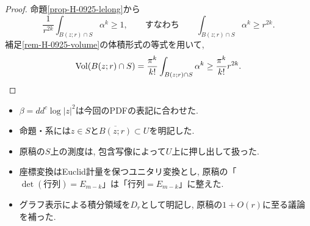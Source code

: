 \begin{proof}
命題\ref{prop-H-0925-lelong}から
\begin{equation*}
\frac{1}{r^{2k}}\int_{B(z;r)\cap S}\alpha^k\geq1,
\qquad\text{すなわち}\qquad
\int_{B(z;r)\cap S}\alpha^k\geq r^{2k}.
\end{equation*}
補足\ref{rem-H-0925-volume}の体積形式の等式を用いて,
\begin{equation*}
\operatorname{Vol}(B(z;r)\cap S)
=\frac{\pi^k}{k!}\int_{B(z;r)\cap S}\alpha^k
\geq\frac{\pi^k}{k!}r^{2k}.
\end{equation*}
\end{proof}

\begin{rem}[原稿の表記と補足について]
\label{rem-H-0925-editorial}
\leavevmode\par
\begin{itemize}
\item $\beta=dd^c\log|z|^2$は今回のPDFの表記に合わせた.
\item 命題・系には$z\in S$と$\overline{B(z;r)}\subset U$を明記した.
\item 原稿の$S$上の測度は, 包含写像によって$U$上に押し出して扱った.
\item 座標変換はEuclid計量を保つユニタリ変換とし,
原稿の「$\det(\text{行列})=E_{m-k}$」は「行列$=E_{m-k}$」に整えた.
\item グラフ表示による積分領域を$D_r$として明記し,
原稿の$1+O(r)$に至る議論を補った.
\end{itemize}
\end{rem}




